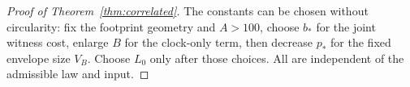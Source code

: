 \begin{proof}[Proof of Theorem~\ref{thm:correlated}]
The constants can be chosen without circularity:
fix the footprint geometry and \(A>100\), choose
\(b_*\) for the joint witness cost, enlarge \(B\)
for the clock-only term, then decrease \(p_*\)
for the fixed envelope size \(V_B\). Choose
\(L_0\) only after those choices. All are
independent of the admissible law and input.
\end{proof}
